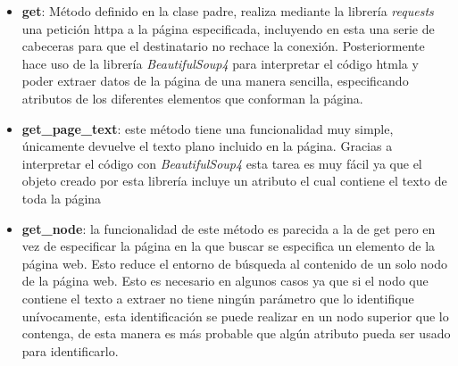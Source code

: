 \begin{itemize}
    \item \textbf{get}: Método definido en la clase padre,
    realiza mediante la librería \textit{requests} una petición \gls{httpa} a la página
    especificada, incluyendo en esta una serie de cabeceras para que el destinatario
    no rechace la conexión. Posteriormente hace uso de la librería \textit{BeautifulSoup4}
    para interpretar el código \gls{htmla} y poder extraer datos de la página de
    una manera sencilla, especificando atributos de los diferentes elementos que
    conforman la página. 
    \item \textbf{get\_page\_text}: este método tiene una funcionalidad muy
    simple, únicamente devuelve el texto plano incluido en la página. Gracias a
    interpretar el código con \textit{BeautifulSoup4} esta tarea es muy fácil ya que el
    objeto creado por esta librería incluye un atributo el cual contiene el
    texto de toda la página 
    
    
    \item \textbf{get\_node}: la funcionalidad de este método es parecida a la de get
    pero en vez de especificar la página en la que buscar se especifica un elemento
    de la página web. Esto reduce el entorno de búsqueda al contenido de un solo
    nodo de la página web. Esto es necesario en algunos casos ya que si el nodo
    que contiene el texto a extraer no tiene ningún parámetro que lo identifique
    unívocamente, esta identificación se puede realizar en un nodo superior que
    lo contenga, de esta manera es más probable que algún atributo pueda ser
    usado para identificarlo. 


\end{itemize}
